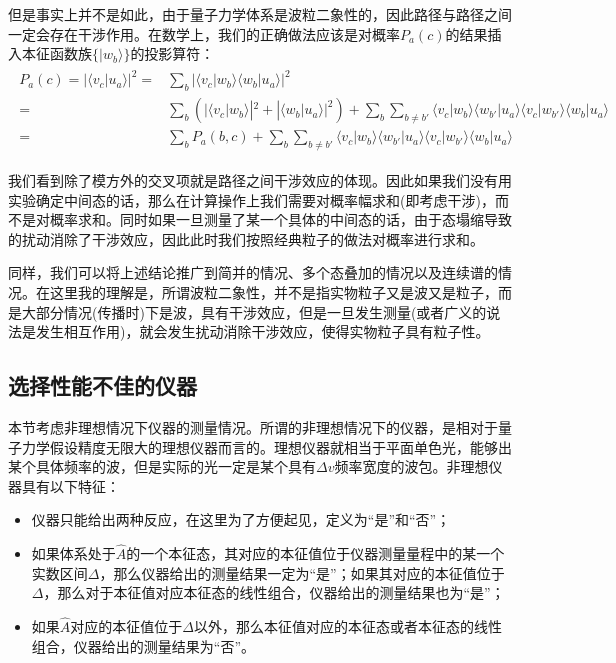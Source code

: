     但是事实上并不是如此，由于量子力学体系是波粒二象性的，因此路径与路径之间一定会存在干涉作用。在数学上，我们的正确做法应该是对概率$P_a(c)$的结果插入本征函数族$\{|w_b\rangle\}$的投影算符：
    \begin{align}
        \begin{split}
            P_a(c)=|\langle v_c|u_a\rangle|^2=&\sum_b|\langle v_c|w_b\rangle\langle w_b|u_a\rangle|^2\\
            =& \sum_b(|\langle v_c|w_b\rangle|^2+|\langle w_b|u_a\rangle|^2)+\sum_b\sum_{b\ne b'}\langle v_c|w_b\rangle\langle w_{b'}|u_a\rangle\langle v_c|w_{b'}\rangle\langle w_b|u_a\rangle\\
            =& \sum_b P_a(b,c)+\sum_b\sum_{b\ne b'}\langle v_c|w_b\rangle\langle w_{b'}|u_a\rangle\langle v_c|w_{b'}\rangle\langle w_b|u_a\rangle
        \end{split}
    \end{align}
    
    我们看到除了模方外的交叉项就是路径之间干涉效应的体现。因此如果我们没有用实验确定中间态的话，那么在计算操作上我们需要对概率幅求和(即考虑干涉)，而不是对概率求和。同时如果一旦测量了某一个具体的中间态的话，由于态塌缩导致的扰动消除了干涉效应，因此此时我们按照经典粒子的做法对概率进行求和。
    
    同样，我们可以将上述结论推广到简并的情况、多个态叠加的情况以及连续谱的情况。在这里我的理解是，所谓波粒二象性，并不是指实物粒子又是波又是粒子，而是大部分情况(传播时)下是波，具有干涉效应，但是一旦发生测量(或者广义的说法是发生相互作用)，就会发生扰动消除干涉效应，使得实物粒子具有粒子性。
    \subsection{选择性能不佳的仪器}
    本节考虑非理想情况下仪器的测量情况。所谓的非理想情况下的仪器，是相对于量子力学假设精度无限大的理想仪器而言的。理想仪器就相当于平面单色光，能够出某个具体频率的波，但是实际的光一定是某个具有$\Delta v$频率宽度的波包。非理想仪器具有以下特征：
    \begin{itemize}
        \item 仪器只能给出两种反应，在这里为了方便起见，定义为“是”和“否”；
        \item 如果体系处于$\hat{A}$的一个本征态，其对应的本征值位于仪器测量量程中的某一个实数区间$\Delta$，那么仪器给出的测量结果一定为“是”；如果其对应的本征值位于$\Delta$，那么对于本征值对应本征态的线性组合，仪器给出的测量结果也为“是”；
        \item 如果$\hat{A}$对应的本征值位于$\Delta$以外，那么本征值对应的本征态或者本征态的线性组合，仪器给出的测量结果为“否”。
    \end{itemize}
    
